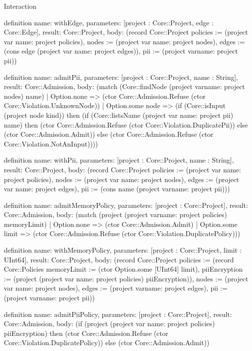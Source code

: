 \begin{lexlean}{Interaction}
\begin{semanticmodule}
definition{
  name: withEdge,
  parameters: [project : Core::Project, edge : Core::Edge],
  result: Core::Project,
  body: (record Core::Project {policies := (project var{
    name: project
  } policies), nodes := (project var{
    name: project
  } nodes), edges := (cons edge (project var{
    name: project
  } edges)), pii := (project var{name: project} pii)})
}

definition{
  name: admitPii,
  parameters: [project : Core::Project, name : String],
  result: Core::Admission,
  body: (match (Core::findNode (project var{name: project} nodes) name)
    | Option.none => (ctor Core::Admission.Refuse (ctor Core::Violation.UnknownNode))
    | Option.some node => (if (Core::isInput (project node kind)) then (if (Core::listsName (project var{
      name: project
    } pii) name) then (ctor Core::Admission.Refuse (ctor Core::Violation.DuplicatePii)) else (ctor Core::Admission.Admit)) else (ctor Core::Admission.Refuse (ctor Core::Violation.NotAnInput))))
}

definition{
  name: withPii,
  parameters: [project : Core::Project, name : String],
  result: Core::Project,
  body: (record Core::Project {policies := (project var{
    name: project
  } policies), nodes := (project var{
    name: project
  } nodes), edges := (project var{
    name: project
  } edges), pii := (cons name (project var{name: project} pii))})
}

definition{
  name: admitMemoryPolicy,
  parameters: [project : Core::Project],
  result: Core::Admission,
  body: (match (project (project var{name: project} policies) memoryLimit)
    | Option.none => (ctor Core::Admission.Admit)
    | Option.some limit => (ctor Core::Admission.Refuse (ctor Core::Violation.DuplicatePolicy)))
}

definition{
  name: withMemoryPolicy,
  parameters: [project : Core::Project, limit : UInt64],
  result: Core::Project,
  body: (record Core::Project {policies := (record Core::Policies {memoryLimit := (ctor Option.some [UInt64] limit), piiEncryption := (project (project var{
    name: project
  } policies) piiEncryption)}), nodes := (project var{
    name: project
  } nodes), edges := (project var{name: project} edges), pii := (project var{name: project} pii)})
}

definition{
  name: admitPiiPolicy,
  parameters: [project : Core::Project],
  result: Core::Admission,
  body: (if (project (project var{
    name: project
  } policies) piiEncryption) then (ctor Core::Admission.Refuse (ctor Core::Violation.DuplicatePolicy)) else (ctor Core::Admission.Admit))
}


\end{semanticmodule}
\end{lexlean}
